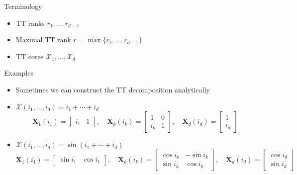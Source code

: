 \documentclass[aspectratio=169]{beamer}
\newcommand{\Mat}[1]{\mathbf{#1}}
\newcommand{\Tns}[1]{\mathcal{#1}}
\begin{document}
\begin{frame}{Terminology}
  \begin{itemize}
    \item
      TT ranks $r_1, \ldots, r_{d - 1}$
    \item
      Maximal TT rank $r = \max\{r_1, \ldots, r_{d - 1}\}$
    \item
      TT cores $\Tns{X}_1, \ldots, \Tns{X}_d$
  \end{itemize}
\end{frame}

\begin{frame}{Examples}
  \begin{itemize}
    \item
      Sometimes we can construct the TT decomposition analytically
    \item
      $\Tns{X}(i_1, \ldots, i_d) = i_1 + \cdots + i_d$
      \begin{equation*}
        \Mat{X}_1(i_1) =
        \begin{bmatrix}
          i_1 & 1
        \end{bmatrix},
        \quad \Mat{X}_k(i_k) =
        \begin{bmatrix}
          1 & 0 \\
          i_k &  1
        \end{bmatrix},
        \quad \Mat{X}_d(i_d) =
        \begin{bmatrix}
          1 \\
          i_d
        \end{bmatrix}
      \end{equation*}
    \item
      $\Tns{X}(i_1, \ldots, i_d) = \sin(i_1 + \cdots + i_d)$
      \begin{equation*}
        \Mat{X}_1(i_1) =
        \begin{bmatrix}
          \sin i_1 & \cos i_1
        \end{bmatrix},
        \quad \Mat{X}_k(i_k) =
        \begin{bmatrix}
          \cos i_k & -\sin i_k \\
          \sin i_k &  \cos i_k
        \end{bmatrix},
        \quad \Mat{X}_d(i_d) =
        \begin{bmatrix}
          \cos i_d \\
          \sin i_d
        \end{bmatrix}
      \end{equation*}
  \end{itemize}
\end{frame}
\end{document}
